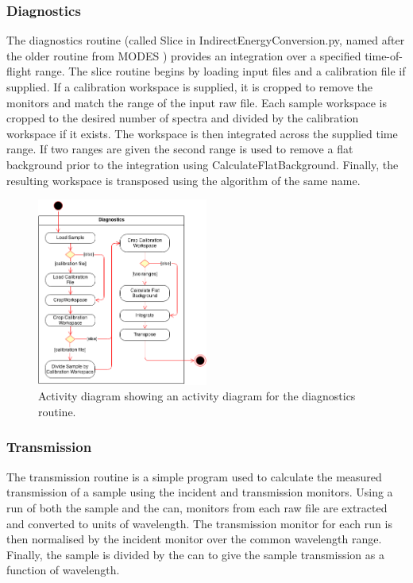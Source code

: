 \documentclass[paper=a4, fontsize=11pt]{scrartcl}	%
\numberwithin{equation}{section}															%
\numberwithin{figure}{section}																%
\numberwithin{table}{section}																%
\begin{document}
\subsubsection{Diagnostics}
The diagnostics routine (called Slice in IndirectEnergyConversion.py, named after the older routine from MODES \citep{wshowells2010}) provides an integration over a specified time-of-flight range. The slice routine begins by loading input files and a calibration file if supplied. If a calibration workspace is supplied, it is cropped to remove the monitors and match the range of the input raw file. Each sample workspace is cropped to the desired number of spectra and divided by the calibration workspace if it exists. The workspace is then integrated across the supplied time range. If two ranges are given the second range is used to remove a flat background prior to the integration using CalculateFlatBackground. Finally, the resulting workspace is transposed using the algorithm of the same name.

\begin{figure}[H]
\centering
\includegraphics[width=0.5\textwidth]{img/uml/activity_diagrams/Diagnostics_activity.png}
\caption{Activity diagram showing an activity diagram for the diagnostics routine.}
\label{fig:c2e-diagnostics-activity-diagram}
\end{figure}

\subsubsection{Transmission}
The transmission routine is a simple program used to calculate the measured transmission of a sample using the incident and transmission monitors. Using a run of both the sample and the can, monitors from each  raw file are extracted and converted to units of wavelength. The transmission monitor for each run is then normalised by the incident monitor over the common wavelength range. Finally, the sample is divided by the can to give the sample transmission as a function of wavelength.
\end{document}
